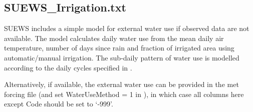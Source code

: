 \documentclass[letterpaper,10pt,english]{sphinxmanual}
\begin{document}
\subsection{SUEWS\_Irrigation.txt}
\label{\detokenize{input_files/SUEWS_SiteInfo/SUEWS_Irrigation:suews-irrigation-txt}}\label{\detokenize{input_files/SUEWS_SiteInfo/SUEWS_Irrigation::doc}}\label{\detokenize{input_files/SUEWS_SiteInfo/SUEWS_Irrigation:id1}}
SUEWS includes a simple model for external water use if observed data
are not available. The model calculates daily water use from the mean
daily air temperature, number of days since rain and fraction of
irrigated area using automatic/manual irrigation. The sub-daily pattern
of water use is modelled according to the daily cycles specified in
{\hyperref[\detokenize{input_files/SUEWS_SiteInfo/SUEWS_Profiles:suews-profiles-txt}]{}}.

Alternatively, if available, the external water use can be provided in
the met forcing file (and set WaterUseMethod = 1 in
{\hyperref[\detokenize{input_files/RunControl/RunControl:runcontrol-nml}]{}}), in which case all columns here
except Code should be set to ‘-999’.
\end{document}
